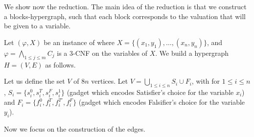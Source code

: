 \documentclass{article}
\newcommand{\PS}{\lang{Paired~SAT}\xspace}
\newcommand{\hyp}{H}
\newcommand{\WS}{E}
\newcommand{\som}{V}
\newcommand{\hxf}{\hyp = (\som, \WS)}
\newcommand{\hedges}{edges\xspace}
\begin{document}
We show now the reduction. The main idea of the reduction is that we construct a blocks-hypergraph, such that each block corresponds to the valuation that will be given to a variable.






Let $(\varphi,X)$ be an instance of \PS where $X = \{(x_1, y_1),\ldots,(x_n, y_n)\}$, and $\varphi = \bigwedge_{1 \le j \le m} C_j$ is a 3-CNF on the variables of $X$. We build a hypergraph $\hxf$ as follows.

Let us define the set $\som$ of $8n$ vertices. Let $\som = \bigcup_{1 \le i \le n} S_i \cup F_i $, with for $1 \le i \le n$, $S_i = \{s_{i}^0,s_{i}^T,s_{i}^F,s_{i}^1\}$ (gadget which encodes Satisfier's choice for the variable $x_i$) and $F_i = \{f_{i}^0,f_{i}^T,f_{i}^{T'},f_{i}^F\}$ (gadget which encodes Falsifier's choice for the variable $y_i$).


Now we focus on the construction of the \hedges. 
\end{document}
